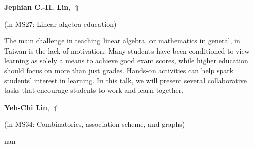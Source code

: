 \documentclass[ILAS2025-program.tex]{subfiles}
\begin{document}
     \hypertarget{down0261}{}\begin{ilasabstract}
    
    \textbf{Jephian C.-H. Lin},  \hfill \hyperlink{up0261}{$\Uparrow$}
    
    (in {\color{mstitle}MS27: Linear algebra education})
        
        \mtskip
    The main challenge in teaching linear algebra, or mathematics in general, in Taiwan is the lack of motivation. Many students have been conditioned to view learning as solely a means to achieve good exam scores, while higher education should focus on more than just grades. Hands-on activities can help spark students' interest in learning. In this talk, we will present several collaborative tasks that encourage students to work and learn together.
\end{ilasabstract}
     \hypertarget{down0324}{}\begin{ilasabstract}
    
    \textbf{Yeh-Chi Lin},  \hfill \hyperlink{up0324}{$\Uparrow$}
    
    (in {\color{mstitle}MS34: Combinatorics, association scheme, and graphs})
        
        \mtskip
    nan\end{ilasabstract}
\end{document}
